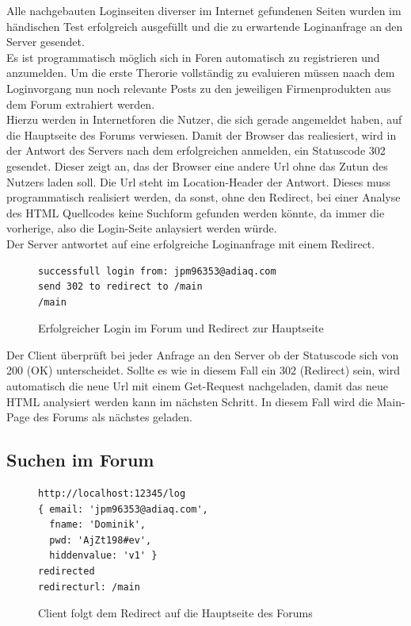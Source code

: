 Alle nachgebauten Loginseiten diverser im Internet gefundenen Seiten wurden im händischen Test erfolgreich ausgefüllt und die zu erwartende Loginanfrage an den Server gesendet.\\
Es ist programmatisch möglich sich in Foren automatisch zu registrieren und anzumelden. Um die erste Therorie vollständig zu evaluieren müssen naach dem Loginvorgang nun noch relevante Posts zu den jeweiligen Firmenprodukten aus dem Forum extrahiert werden.\\
Hierzu werden in Internetforen die Nutzer, die sich gerade angemeldet haben, auf die Hauptseite des Forums verwiesen. Damit der Browser das realiesiert, wird in der Antwort des Servers nach dem erfolgreichen anmelden, ein Statuscode 302 gesendet. Dieser zeigt an, das der Browser eine andere Url ohne das Zutun des Nutzers laden soll. Die Url steht im Location-Header der Antwort. Dieses muss programmatisch realisiert werden, da sonst, ohne den Redirect, bei einer Analyse des HTML Quellcodes keine Suchform gefunden werden könnte, da immer die vorherige, also die Login-Seite anlaysiert werden würde.\\
Der Server antwortet auf eine erfolgreiche Loginanfrage mit einem Redirect.

\begin{figure}[ht]
\begin{lstlisting}[language=HTML5]
successfull login from: jpm96353@adiaq.com
send 302 to redirect to /main
/main
\end{lstlisting}
\caption{Erfolgreicher Login im Forum und Redirect zur Hauptseite}
\end{figure}

Der Client überprüft  bei jeder Anfrage an den Server ob der Statuscode sich von 200 (OK) unterscheidet. Sollte es wie in diesem Fall ein 302 (Redirect) sein, wird automatisch die neue Url mit einem Get-Request nachgeladen, damit das neue HTML analysiert werden kann im nächsten Schritt. In diesem Fall wird die Main- Page des Forums als nächstes geladen.


\subsection{Suchen im Forum}
\begin{figure}[ht]
\begin{lstlisting}[language=HTML5]
http://localhost:12345/log
{ email: 'jpm96353@adiaq.com',
  fname: 'Dominik',
  pwd: 'AjZt198#ev',
  hiddenvalue: 'v1' }
redirected
redirecturl: /main
\end{lstlisting}
\caption{Client folgt dem Redirect auf die Hauptseite des Forums}
\end{figure}

